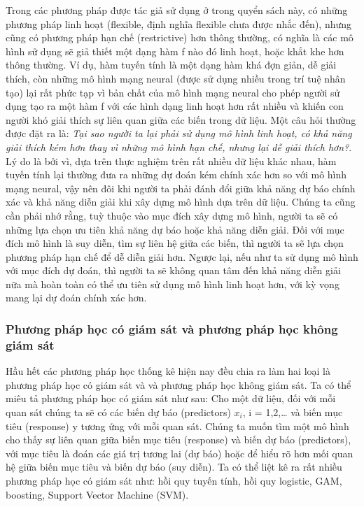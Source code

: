 \documentclass[
]{article}
\begin{document}
Trong các phương pháp được tác giả sử dụng ở trong quyển sách này, có những phương pháp linh hoạt (flexible, định nghĩa flexible chưa được nhắc đến), nhưng cũng có phương pháp hạn chế (restrictive) hơn thông thường, có nghĩa là các mô hình sử dụng sẽ giả thiết một dạng hàm f nào đó linh hoạt, hoặc khắt khe hơn thông thường. Ví dụ, hàm tuyến tính là một dạng hàm khá đợn giản, dễ giải thích, còn những mô hình mạng neural (được sử dụng nhiều trong trí tuệ nhân tạo) lại rất phức tạp vì bản chất của mô hình mạng neural cho phép người sử dụng tạo ra một hàm f với các hình dạng linh hoạt hơn rất nhiều và khiến con người khó giải thích sự liên quan giữa các biến trong dữ liệu. Một câu hỏi thường được đặt ra là: \emph{Tại sao người ta lại phải sử dụng mô hình linh hoạt, có khả năng giải thích kém hơn thay vì những mô hình hạn chế, nhưng lại dễ giải thích hơn?}. Lý do là bởi vì, dựa trên thực nghiệm trên rất nhiều dữ liệu khác nhau, hàm tuyến tính lại thường đưa ra những dự đoán kém chính xác hơn so với mô hình mạng neural, vậy nên đôi khi người ta phải đánh đổi giữa khả năng dự báo chính xác và khả năng diễn giải khi xây dựng mô hình dựa trên dữ liệu. Chúng ta cũng cần phải nhớ rằng, tuỳ thuộc vào mục đích xây dựng mô hình, người ta sẽ có những lựa chọn ưu tiên khả năng dự báo hoặc khả năng diễn giải. Đối với mục đích mô hình là suy diễn, tìm sự liên hệ giữa các biến, thì người ta sẽ lựa chọn phương pháp hạn chế để dễ diễn giải hơn. Ngược lại, nếu như ta sử dụng mô hình với mục đích dự đoán, thì người ta sẽ không quan tâm đến khả năng diễn giải nữa mà hoàn toàn có thể ưu tiên sử dụng mô hình linh hoạt hơn, với kỳ vọng mang lại dự đoán chính xác hơn.

\hypertarget{phux1b0ux1a1ng-phuxe1p-hux1ecdc-cuxf3-giuxe1m-suxe1t-vuxe0-phux1b0ux1a1ng-phuxe1p-hux1ecdc-khuxf4ng-giuxe1m-suxe1t}{%
\subsubsection{Phương pháp học có giám sát và phương pháp học không giám sát}\label{phux1b0ux1a1ng-phuxe1p-hux1ecdc-cuxf3-giuxe1m-suxe1t-vuxe0-phux1b0ux1a1ng-phuxe1p-hux1ecdc-khuxf4ng-giuxe1m-suxe1t}}

Hầu hết các phương pháp học thống kê hiện nay đều chia ra làm hai loại là phương pháp học có giám sát và và phương pháp học không giám sát. Ta có thể miêu tả phương pháp học có giám sát như sau: Cho một dữ liệu, đối với mỗi quan sát chúng ta sẽ có các biến dự báo (predictors) \(x_i\), i = 1,2,\ldots{} và biến mục tiêu (response) y tương ứng với mỗi quan sát. Chúng ta muốn tìm một mô hình cho thấy sự liên quan giữa biến mục tiêu (response) và biến dự báo (predictors), với mục tiêu là đoán các giá trị tương lai (dự báo) hoặc để hiểu rõ hơn mối quan hệ giữa biến mục tiêu và biến dự báo (suy diễn). Ta có thể liệt kê ra rất nhiều phương pháp học có giám sát như: hồi quy tuyến tính, hồi quy logistic, GAM, boosting, Support Vector Machine (SVM).
\end{document}

